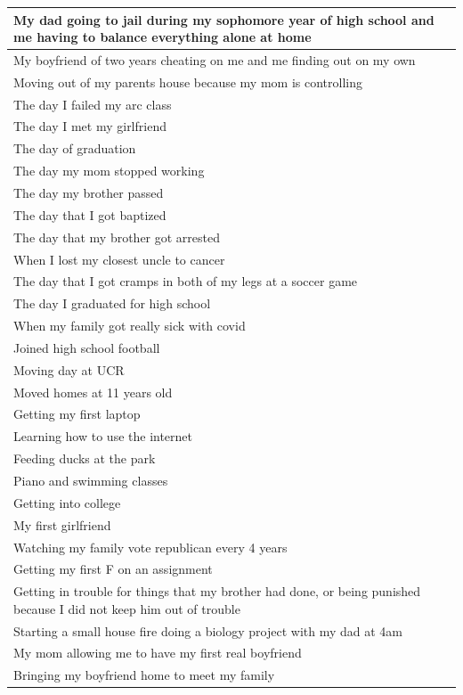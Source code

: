 \documentclass[
  .7em,
  letterpaper,
  DIV=11,
  numbers=noendperiod]{scrartcl}
\begin{document}
\begin{table}
\begin{tabular}{l}
\hline
My dad going to jail during my sophomore year of high school and me having to balance everything alone at home\\
\hline
My boyfriend of two years cheating on me and me finding out on my own\\
\hline
Moving out of my parents house because my mom is controlling\\
\hline
The day I failed my arc class\\
\hline
The day I met my girlfriend\\
\hline
The day of graduation\\
\hline
The day my mom stopped working\\
\hline
The day my brother passed\\
\hline
The day that I got baptized\\
\hline
The day that my brother got arrested\\
\hline
When I lost my closest uncle to cancer\\
\hline
The day that I got cramps in both of my legs at a soccer game\\
\hline
The day I graduated for high school\\
\hline
When my family got really sick with covid\\
\hline
Joined high school football\\
\hline
Moving day at UCR\\
\hline
Moved homes at 11 years old\\
\hline
Getting my first laptop\\
\hline
Learning how to use the internet\\
\hline
Feeding ducks at the park\\
\hline
Piano and swimming classes\\
\hline
Getting into college\\
\hline
My first girlfriend\\
\hline
Watching my family vote republican every 4 years\\
\hline
Getting my first F on an assignment\\
\hline
Getting in trouble for things that my brother had done, or being punished because I did not keep him out of trouble\\
\hline
Starting a small house fire doing a biology project with my dad at 4am\\
\hline
My mom allowing me to have my first real boyfriend\\
\hline
Bringing my boyfriend home to meet my family\\

\end{tabular}
\end{table}
\end{document}
